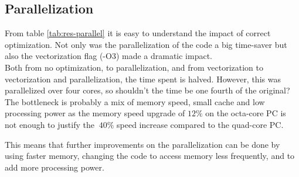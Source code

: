 \documentclass[../main.tex]{subfiles}
\begin{document}
\subsection{Parallelization}
From table \ref{tab:res-parallel} it is easy to understand the impact of correct optimization. Not only was the parallelization of the code a big time-saver but also the vectorization flag (-O3) made a dramatic impact.\\

Both from no optimization, to parallelization, and from vectorization to vectorization and parallelization, the time spent is halved. However, this was parallelized over four cores, so shouldn't the time be one fourth of the original? The bottleneck is probably a mix of memory speed, small cache and low processing power as the memory speed upgrade of $12\%$ on the octa-core PC is not enough to justify the $~40\%$ speed increase compared to the quad-core PC.

This means that further improvements on the parallelization can be done by using faster memory, changing the code to access memory less frequently, and to add more processing power.
\end{document}
